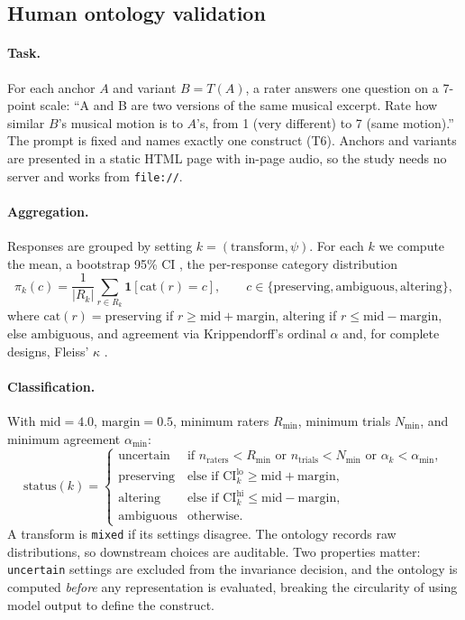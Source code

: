 \documentclass[11pt]{article}
\newcommand{\ind}{\mathbf{1}}
\begin{document}
\subsection{Human ontology validation}
\label{sec:ontology}
\paragraph{Task.} For each anchor $A$ and variant $B=T(A)$, a rater answers one
question on a 7-point scale: ``A and B are two versions of the same musical
excerpt. Rate how similar $B$'s musical motion is to $A$'s, from 1 (very
different) to 7 (same motion).'' The prompt is fixed and names exactly one
construct (T6). Anchors and variants are presented in a static HTML page with
in-page audio, so the study needs no server and works from \texttt{file://}.

\paragraph{Aggregation.} Responses are grouped by setting
$k=(\text{transform},\psi)$. For each $k$ we compute the mean, a bootstrap 95\%
CI \citep{efron1993bootstrap}, the per-response category distribution
\begin{equation}
\pi_k(c) = \frac{1}{|R_k|}\sum_{r\in R_k}\ind\!\left[\mathrm{cat}(r)=c\right],
\qquad c \in \{\text{preserving},\text{ambiguous},\text{altering}\},
\end{equation}
where $\mathrm{cat}(r)=\text{preserving}$ if $r\ge \text{mid}+\text{margin}$,
$\text{altering}$ if $r\le \text{mid}-\text{margin}$, else $\text{ambiguous}$, and
agreement via Krippendorff's ordinal $\alpha$ \citep{krippendorff2004content} and,
for complete designs, Fleiss' $\kappa$ \citep{fleiss1971measuring}.

\paragraph{Classification.} With $\text{mid}=4.0$, $\text{margin}=0.5$, minimum
raters $R_{\min}$, minimum trials $N_{\min}$, and minimum agreement
$\alpha_{\min}$:
\begin{equation}
\text{status}(k)=
\begin{cases}
\text{uncertain} & \text{if } n_{\text{raters}}<R_{\min} \text{ or } n_{\text{trials}}<N_{\min} \text{ or } \alpha_k<\alpha_{\min},\\[2pt]
\text{preserving} & \text{else if } \mathrm{CI}^{\text{lo}}_k \ge \text{mid}+\text{margin},\\[2pt]
\text{altering} & \text{else if } \mathrm{CI}^{\text{hi}}_k \le \text{mid}-\text{margin},\\[2pt]
\text{ambiguous} & \text{otherwise.}
\end{cases}
\end{equation}
A transform is \texttt{mixed} if its settings disagree. The ontology records raw
distributions, so downstream choices are auditable. Two properties matter:
\texttt{uncertain} settings are excluded from the invariance decision, and the
ontology is computed \emph{before} any representation is evaluated, breaking the
circularity of using model output to define the construct.
\end{document}
